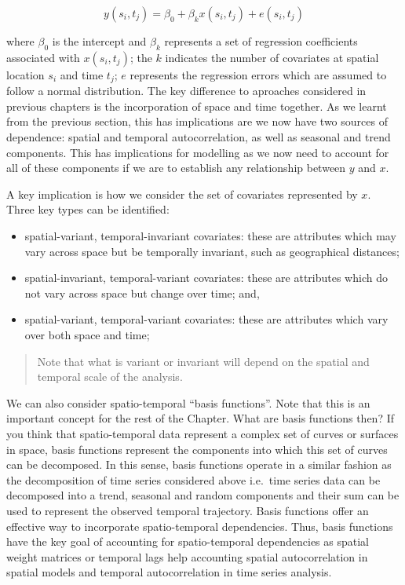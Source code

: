 \documentclass[
  letterpaper,
  DIV=11,
  numbers=noendperiod,
  oneside]{scrreprt}
\begin{document}
\[y(s_{i}, t_{j}) = \beta_{0} + \beta_{k}x(s_{i}, t_{j}) + e(s_{i}, t_{j})\]

where \(\beta_{0}\) is the intercept and \(\beta_{k}\) represents a set
of regression coefficients associated with \(x(s_{i}, t_{j})\); the
\(k\) indicates the number of covariates at spatial location \(s_{i}\)
and time \(t_{j}\); \(e\) represents the regression errors which are
assumed to follow a normal distribution. The key difference to aproaches
considered in previous chapters is the incorporation of space and time
together. As we learnt from the previous section, this has implications
are we now have two sources of dependence: spatial and temporal
autocorrelation, as well as seasonal and trend components. This has
implications for modelling as we now need to account for all of these
components if we are to establish any relationship between \(y\) and
\(x\).

A key implication is how we consider the set of covariates represented
by \(x\). Three key types can be identified:

\begin{itemize}
\item
  spatial-variant, temporal-invariant covariates: these are attributes
  which may vary across space but be temporally invariant, such as
  geographical distances;
\item
  spatial-invariant, temporal-variant covariates: these are attributes
  which do not vary across space but change over time; and,
\item
  spatial-variant, temporal-variant covariates: these are attributes
  which vary over both space and time;
\end{itemize}

\begin{quote}
Note that what is variant or invariant will depend on the spatial and
temporal scale of the analysis.
\end{quote}

We can also consider spatio-temporal ``basis functions''. Note that this
is an important concept for the rest of the Chapter. What are basis
functions then? If you think that spatio-temporal data represent a
complex set of curves or surfaces in space, basis functions represent
the components into which this set of curves can be decomposed. In this
sense, basis functions operate in a similar fashion as the decomposition
of time series considered above i.e.~time series data can be decomposed
into a trend, seasonal and random components and their sum can be used
to represent the observed temporal trajectory. Basis functions offer an
effective way to incorporate spatio-temporal dependencies. Thus, basis
functions have the key goal of accounting for spatio-temporal
dependencies as spatial weight matrices or temporal lags help accounting
spatial autocorrelation in spatial models and temporal autocorrelation
in time series analysis.
\end{document}
